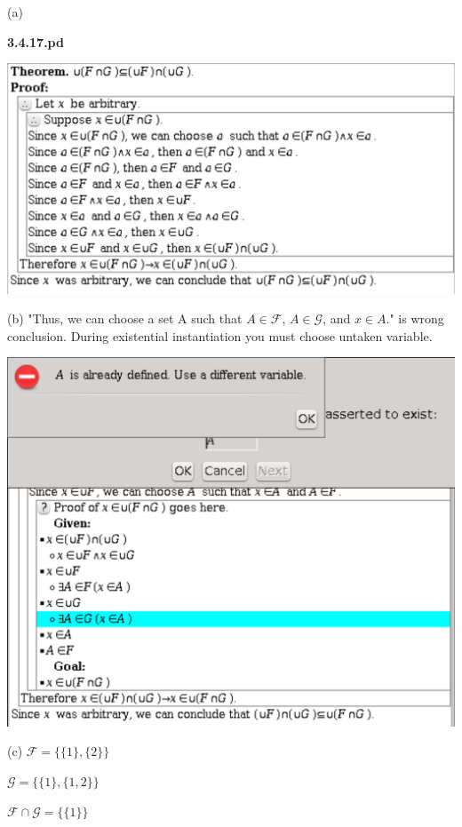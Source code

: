 \documentclass{article}
\begin{document}
(a)

\textbf{3.4.17.pd}
\vspace{10pt}

\includegraphics[width=\textwidth]{3_4_17_1}

\vspace{30pt}

(b) "Thus, we can choose a set A such that $A \in \mathcal{F}$, $A \in \mathcal{G}$, and $x \in A$." is wrong conclusion. During existential instantiation you must choose untaken variable.

\includegraphics[width=\textwidth]{3_4_17_2}

\vspace{30pt}

(c) $\mathcal{F} = \{\{1\},\{2\}\}$

$\mathcal{G} = \{\{1\},\{1,2\}\}$

$\mathcal{F} \cap \mathcal{G}= \{\{1\}\}$
\end{document}
